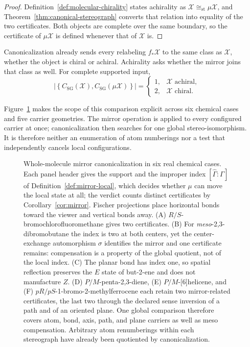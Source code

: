 \documentclass[pdflatex,sn-mathphys-num,referee,lineno]{sn-jnl}
\theoremstyle{plain}
\theoremstyle{remark}
\theoremstyle{definition}
\begin{document}
\begin{proof}
Definition~\ref{def:molecular-chirality} states achirality as
\(\mathcal X\cong_{\mathrm{st}}\mu\mathcal X\), and
Theorem~\ref{thm:canonical-stereograph} converts that relation into equality of
the two certificates.  Both objects are complete over the same boundary, so the
certificate of \(\mu\mathcal X\) is defined whenever that of \(\mathcal X\) is.
\end{proof}

Canonicalization already sends every relabeling \(f_*\mathcal X\) to the same
class as \(\mathcal X\), whether the object is chiral or achiral.  Achirality
asks whether the mirror joins that class as well.  For complete supported
input,
\[
  \left|
  \left\{C_{\mathrm{SG}}(\mathcal X),
         C_{\mathrm{SG}}(\mu\mathcal X)\right\}
  \right|
  =
  \begin{cases}
    1,&\mathcal X\text{ achiral},\\
    2,&\mathcal X\text{ chiral}.
  \end{cases}
\]

Figure~\ref{fig:mirror-canonical-examples} makes the scope of this comparison
explicit across six chemical cases and five carrier geometries.  The mirror
operation is applied to every configured carrier at once; canonicalization
then searches for one global stereo-isomorphism.  It is therefore neither an
enumeration of atom numberings nor a test that independently cancels local
configurations.

\begin{figure}[htbp]
  \centering
  \resizebox{0.98\textwidth}{!}{%
    }
  \caption{Whole-molecule mirror canonicalization in six real chemical cases.
  Each panel header gives the support and the improper index
  \(\left[\widehat\Gamma:\Gamma\right]\) of Definition~\ref{def:mirror-local},
  which decides whether \(\mu\) can move the local state at all; the verdict
  counts distinct certificates by Corollary~\ref{cor:mirror}.  Fischer
  projections place horizontal bonds toward the viewer and vertical
  bonds away.  (A) \(R/S\)-bromochlorofluoromethane gives two certificates.
  (B) For \emph{meso}-2,3-dibromobutane the index is two at both centers, yet
  the center-exchange automorphism \(\sigma\) identifies the mirror and one
  certificate remains: compensation is a property of the global quotient, not
  of the local index.  (C) The planar bond has index one, so spatial reflection
  preserves the \(E\) state of but-2-ene and does not manufacture \(Z\).
  (D) \(P/M\)-penta-2,3-diene, (E) \(P/M\)-[6]helicene, and
  (F) \(pR/pS\)-1-bromo-2-methylferrocene each retain two mirror-related
  certificates, the last two through the declared sense inversion of a path and
  of an oriented plane.  One global comparison therefore covers atom, bond,
  axis, path, and plane carriers as well as meso compensation.  Arbitrary atom
  renumberings within each stereograph have already been quotiented by
  canonicalization.}
  \label{fig:mirror-canonical-examples}
\end{figure}
\end{document}
